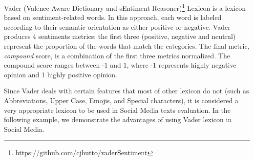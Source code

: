 
Vader (Valence Aware Dictionary and sEntiment Reasoner)\footnote{https://github.com/cjhutto/vaderSentiment}
Lexicon is a lexicon based on sentiment-related words. In this approach, each word is labeled according to their semantic orientation as either positive or negative. Vader produces 4 sentiments metrics: the first three (positive, negative and neutral) represent the proportion of the words that match the categories. The final metric, \textit{compound} score, is a combination of the first three metrics normalized.
The compound score ranges between -1 and 1, where -1 represents highly negative opinion and 1 highly positive opinion.


Since Vader deals with certain features that most of  other lexicon do not (such as Abbreviations, Upper Case, Emojis, and Special characters), it is considered a very appropriate lexicon to be used in Social Media texts evaluation. 
In the following example, we demonstrate the advantages of using Vader lexicon in Social Media.

